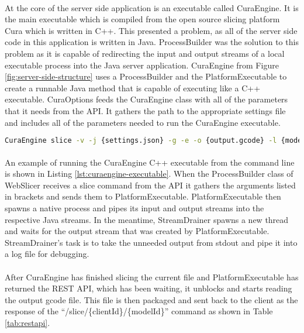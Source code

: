 \paragraph{}
At the core of the server side application is an executable called CuraEngine. 
It is the main executable which is compiled from the open source slicing platform Cura which is written in C++. 
This presented a problem, as all of the server side code in this application is written in Java. 
ProcessBuilder was the solution to this problem as it is capable of redirecting the input and output streams of a local executable process into the Java server application.
CuraEngine from Figure \ref{fig:server-side-structure} uses a ProcessBuilder and the PlatformExecutable to create a runnable Java method that is capable of executing like a C++ executable.
CuraOptions feeds the CuraEngine class with all of the parameters that it needs from the API.
It gathers the path to the appropriate settings file and includes all of the parameters needed to run the CuraEngine executable.

\begin{lstlisting}[language=sh, label={lst:curaengine-executable}, caption=An example of running CuraEngine C++ executable directly from the command line.]
CuraEngine slice -v -j {settings.json} -g -e -o {output.gcode} -l {model-file.stl}
\end{lstlisting}

\paragraph{}
An example of running the CuraEngine C++ executable from the command line is shown in Listing \ref{lst:curaengine-executable}.
When the ProcessBuilder class of WebSlicer receives a slice command from the API it gathers the arguments listed in brackets and sends them to PlatformExecutable.
PlatformExecutable then spawns a native process and pipes its input and output streams into the respective Java streams.
In the meantime, StreamDrainer spawns a new thread and waits for the output stream that was created by PlatformExecutable.
StreamDrainer's task is to take the unneeded output from stdout and pipe it into a log file for debugging.

\paragraph{}
After CuraEngine has finished slicing the current file and PlatformExecutable has returned the REST API, which has been waiting, it unblocks and starts reading the output gcode file.
This file is then packaged and sent back to the client as the response of the ``/slice/\{clientId\}/\{modelId\}'' command as shown in Table \ref{tab:restapi}.

